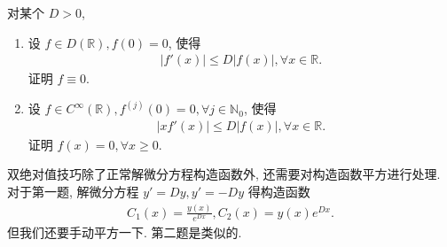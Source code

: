 \documentclass[../../main.tex]{subfiles}
\begin{document}
\begin{example}\label{example:双绝对值经典问题}
对某个 $D > 0$,
\begin{enumerate}
\item 设 $f\in D(\mathbb{R}),f(0)=0$, 使得
\begin{align}\label{equation-----1229}
|f'(x)|\leqslant D|f(x)|,\forall x\in\mathbb{R}.
\end{align}
证明 $f\equiv0$.

\item 设 $f\in C^\infty(\mathbb{R}),f^{(j)}(0)=0,\forall j\in\mathbb{N}_0$, 使得
\begin{align}\label{equation-----1230}
|xf'(x)|\leqslant D|f(x)|,\forall x\in\mathbb{R}.
\end{align}
证明 $f(x)=0,\forall x\geqslant0$.
\end{enumerate}
\end{example}
\begin{note}
双绝对值技巧除了正常解微分方程构造函数外, 还需要对构造函数平方进行处理. 对于第一题, 解微分方程 $y' = Dy,y' = -Dy$ 得构造函数
\begin{align*}
C_1(x)=\frac{y(x)}{e^{Dx}},C_2(x)=y(x)e^{Dx}.
\end{align*}
但我们还要手动平方一下. 第二题是类似的.
\end{note}
\end{document}
